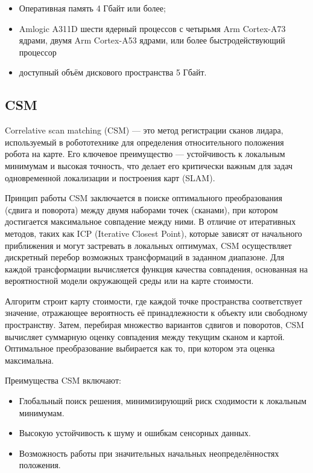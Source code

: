 \begin{itemize}
	\item Оперативная память 4 Гбайт или более;
	\item Amlogic A311D шести ядерный процессов с четырьмя Arm Cortex-A73
		ядрами, двумя Arm Cortex-A53 ядрами, или более быстродействующий
		процессор
	\item доступный объём дискового пространства 5 Гбайт. %
\end{itemize}

\subsection{CSM}
Correlative scan matching (CSM) — это метод регистрации сканов лидара, используемый в робототехнике для определения относительного положения робота на карте. Его ключевое преимущество — устойчивость к локальным минимумам и высокая точность, что делает его критически важным для задач одновременной локализации и построения карт (SLAM).

Принцип работы CSM заключается в поиске оптимального преобразования (сдвига и поворота) между двумя наборами точек (сканами), при котором достигается максимальное совпадение между ними. В отличие от итеративных методов, таких как ICP (Iterative Closest Point), которые зависят от начального приближения и могут застревать в локальных оптимумах, CSM осуществляет дискретный перебор возможных трансформаций в заданном диапазоне. Для каждой трансформации вычисляется функция качества совпадения, основанная на вероятностной модели окружающей среды или на карте стоимости.

Алгоритм строит карту стоимости, где каждой точке пространства соответствует значение, отражающее вероятность её принадлежности к объекту или свободному пространству. Затем, перебирая множество вариантов сдвигов и поворотов, CSM вычисляет суммарную оценку совпадения между текущим сканом и картой. Оптимальное преобразование выбирается как то, при котором эта оценка максимальна.

Преимущества CSM включают:
\begin{itemize}
	\item Глобальный поиск решения, минимизирующий риск сходимости к локальным минимумам.
	\item Высокую устойчивость к шуму и ошибкам сенсорных данных.
	\item Возможность работы при значительных начальных неопределённостях положения.
\end{itemize}

